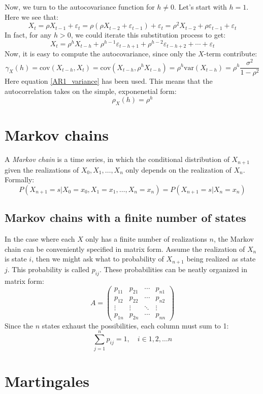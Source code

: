 \documentclass[12pt, a4paper]{article}
\numberwithin{equation}{section}
\begin{document}
Now, we turn to the autocovariance function for $h\neq 0$. Let's start with $h=1$. Here we see that:
\begin{equation}
X_t=\rho X_{t-1}+\varepsilon_t=\rho(\rho X_{t-2}+\varepsilon_{t-1})+\varepsilon_t=\rho^2 X_{t-2}+\rho\varepsilon_{t-1}+\varepsilon_t
\end{equation}
In fact, for any $h>0$, we could iterate this substitution process to get:
\begin{equation}
X_t=\rho^h X_{t-h}+\rho^{h-1}\varepsilon_{t-h+1}+\rho^{h-2}\varepsilon_{t-h+2}+\cdots+\varepsilon_t
\end{equation}
Now, it is easy to compute the autocovariance, since only the $X$-term contribute:
\begin{equation}
\gamma_X(h)=\textrm{cov}(X_{t-h},X_t)=\textrm{cov}(X_{t-h},\rho^h X_{t-h})=\rho^h\textrm{var}(X_{t-h})=\rho^h\frac{\sigma^2}{1-\rho^2}
\end{equation}
Here equation \ref{AR1_variance} has been used. This means that the autocorrelation takes on the simple, exponenetial form:
\begin{equation}
\rho_X(h)=\rho^h
\end{equation}
\section{Markov chains}
A \textit{Markov chain} is a time series, in which the conditional distribution of $X_{n+1}$ given the realizations of $X_0, X_1,\ldots, X_n$ only depends on the realization of $X_n$. Formally:
\begin{equation}
P(X_{n+1}=s|X_0=x_0, X_1=x_1,\ldots, X_n=x_n)=P(X_{n+1}=s|X_n=x_n)
\end{equation}


\subsection{Markov chains with a finite number of states}
In the case where each $X$ only has a finite number of realizations $n$, the Markov chain can be conveniently specified in matrix form. Assume the realization of $X_n$ is state $i$, then we might ask what to probability of $X_{n+1}$ being realized as state $j$. This probability is called $p_{ij}$. These probabilities can be neatly organized in matrix form:
\begin{equation}
A=\begin{pmatrix}
p_{11}	& p_{21}	& \cdots	& p_{n1} \\
p_{12}	& p_{22}	& \cdots	& p_{n2} \\
\vdots	& \vdots	& \ddots	& \vdots \\
p_{1n}	& p_{2n}	& \cdots	& p_{nn}
\end{pmatrix}
\end{equation}
Since the $n$ states exhaust the possibilities, each column must sum to 1:
\begin{equation}
\sum_{j=1}^n p_{ij}=1,\quad i\in{1,2,\ldots n}
\end{equation}

\section{Martingales}
\end{document}
